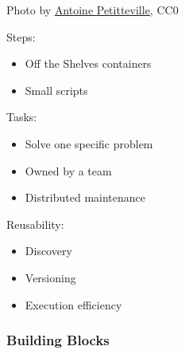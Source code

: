 \documentclass[aspectratio=169,11pt,hyperref={colorlinks=true}]{beamer}
\begin{document}
\begin{lpicrblack}{%
  Photo by \href{https://unsplash.com/@ant0ine}{\underline{Antoine Petitteville}}, CC0
  }%
  {%
    Steps:
    \begin{itemize}
      \item Off the Shelves containers
      \item Small scripts %
    \end{itemize}
    Tasks:
    \begin{itemize}
      \item Solve one specific problem
      \item Owned by a team
      \item Distributed maintenance
    \end{itemize}
    \vspace{0.05\paperheight}
    Reusability:
    \begin{itemize}
      \item Discovery
      \item Versioning
      \item Execution efficiency %
    \end{itemize}
  }{}%
  \frametitle{Building Blocks}
\end{lpicrblack}
\end{document}
